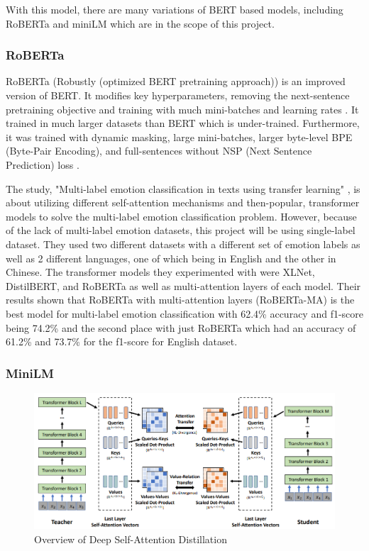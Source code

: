 With this model, there are many variations of BERT based models, including RoBERTa and miniLM which are in the scope of this project. 

\subsubsection{RoBERTa}
RoBERTa (Robustly (optimized BERT pretraining approach)) is an improved version of BERT.
It modifies key hyperparameters, removing the next-sentence pretraining objective and training with much mini-batches and learning rates \cite{Sharma_2022}.
It trained in much larger datasets than BERT which is under-trained. 
Furthermore, it was trained with dynamic masking, large mini-batches, larger byte-level BPE (Byte-Pair Encoding), and full-sentences without NSP (Next Sentence Prediction) loss \cite{Sharma_2022}.

The study, "Multi-label emotion classification in texts using transfer learning" \cite{AMEER2023118534}, is about utilizing different self-attention mechanisms and then-popular, transformer models to solve the multi-label emotion classification problem.
However, because of the lack of multi-label emotion datasets, this project will be using single-label dataset.
They used two different datasets with a different set of emotion labels as well as 2 different languages, one of which being in English and the other in Chinese.
The transformer models they experimented with were XLNet, DistilBERT, and RoBERTa as well as multi-attention layers of each model.
Their results shown that RoBERTa with multi-attention layers (RoBERTa-MA) is the best model for multi-label emotion classification with 62.4\% accuracy and f1-score being 74.2\% and the second place with just RoBERTa which had an accuracy of 61.2\% and 73.7\% for the f1-score for English dataset. 

\subsubsection{MiniLM}

\begin{figure}[ht]
    \centerline{\includegraphics[scale=.5]{Figures/deep_self-distillation.png}}
    \caption{Overview of Deep Self-Attention Distillation}
    \label{fig:distillation}
 \end{figure}

